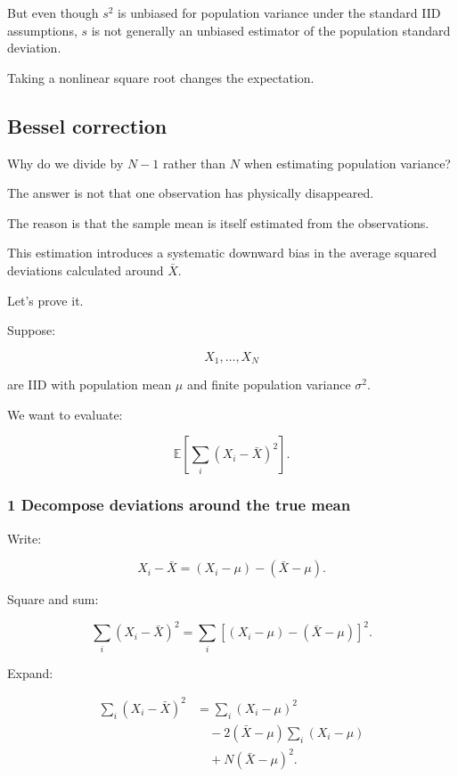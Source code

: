But even though \(s^2\) is unbiased for population variance under the standard IID assumptions, \(s\) is not generally an unbiased estimator of the population standard deviation.

Taking a nonlinear square root changes the expectation.

\subsection{Bessel correction}\label{02-foundations-ii-ch030-bessel-correction}

\hypertarget{02-foundations-ii-ch030-bessel-correction}{}

Why do we divide by \(N-1\) rather than \(N\) when estimating population variance?

The answer is not that one observation has physically disappeared.

The reason is that the sample mean is itself estimated from the observations.

This estimation introduces a systematic downward bias in the average squared deviations calculated around \(\bar X\).

Let's prove it.

Suppose:

\[
 X_1,\ldots,X_N
\]

are IID with population mean \(\mu\) and finite population variance \(\sigma^2\).

We want to evaluate:

\[
 \mathbb E\left[ \sum_i(X_i-\bar X)^2 \right].
\]

\subsubsection{1 Decompose deviations around the true mean}\label{02-foundations-ii-ch030-decompose-deviations-around-the-true-mean}

\hypertarget{02-foundations-ii-ch030-decompose-deviations-around-the-true-mean}{}

Write:

\[
 X_i-\bar X = (X_i-\mu)-(\bar X-\mu).
\]

Square and sum:

\[
 \sum_i(X_i-\bar X)^2 = \sum_i[ (X_i-\mu)-(\bar X-\mu) ]^2.
\]

Expand:

\[
 \begin{aligned} \sum_i(X_i-\bar X)^2 &= \sum_i(X_i-\mu)^2\\ &\quad-2(\bar X-\mu)\sum_i(X_i-\mu)\\ &\quad+N(\bar X-\mu)^2. \end{aligned}
\]

